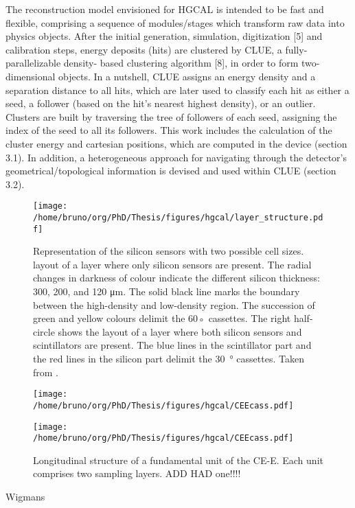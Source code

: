 \documentclass[11pt]{article}
\begin{document}
\begin{enumerate}
The reconstruction model envisioned for \ac{HGCAL} is intended to be fast and flexible, comprising a sequence of modules/stages which transform raw data into physics objects.
After the initial generation, simulation, digitization [5]
and calibration steps, energy deposits (hits) are clustered by CLUE, a fully-parallelizable density-
based clustering algorithm [8], in order to form two-dimensional objects. In a nutshell, CLUE
assigns an energy density and a separation distance to all hits, which are later used to classify
each hit as either a seed, a follower (based on the hit’s nearest highest density), or an outlier.
Clusters are built by traversing the tree of followers of each seed, assigning the index of the
seed to all its followers. This work includes the calculation of the cluster energy and cartesian
positions, which are computed in the device (section 3.1). In addition, a heterogeneous approach
for navigating through the detector’s geometrical/topological information is devised and used
within CLUE (section 3.2).

\begin{figure}
\begin{center}
\texttt{[image: /home/bruno/org/PhD/Thesis/figures/hgcal/layer\_structure.pdf]}
\end{center}
\caption{\label{fig:hgcal_side_view}Representation of the silicon sensors with two possible cell sizes. layout of a layer where only silicon sensors are present. The radial changes in darkness of colour indicate the different silicon thickness: 300, 200, and 120 μm. The solid black line marks the boundary between the high-density and low-density region. The succession of green and yellow colours delimit the 60◦ cassettes. The right half-circle shows the layout of a layer where both silicon sensors and scintillators are present. The blue lines in the scintillator part and the red lines in the silicon part delimit the \SI{30}{\degree} cassettes. Taken from \cite{tarabini_thesis}.}
\end{figure}

\begin{figure}
\begin{center}
\texttt{[image: /home/bruno/org/PhD/Thesis/figures/hgcal/CEEcass.pdf]}
\end{center}
\begin{center}
\texttt{[image: /home/bruno/org/PhD/Thesis/figures/hgcal/CEEcass.pdf]}
\end{center}
\caption{\label{fig:hgcal_long_structure}Longitudinal structure of a fundamental unit of the \ac{CE-E}. Each unit comprises two sampling layers. ADD HAD one!!!!}
\end{figure}


Wigmans \cite{wigmans2,wigmans}
\end{enumerate}
\end{document}
